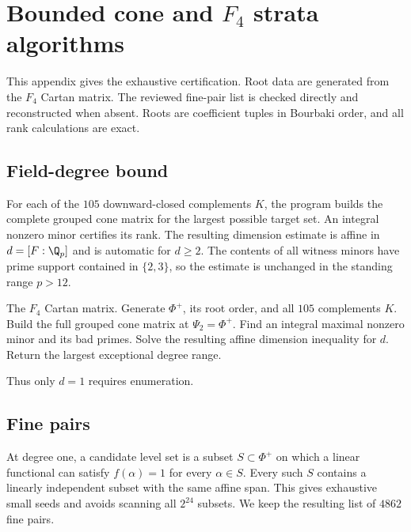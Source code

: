 \section{Bounded cone and $F_4$ strata algorithms}
\label{app:cone-model-algorithms}

This appendix gives the exhaustive certification.  Root data are generated
from the $F_4$ Cartan matrix.  The reviewed fine-pair list is checked directly
and reconstructed when absent.  Roots are coefficient tuples in Bourbaki
order, and all rank calculations are exact.

\subsection{Field-degree bound}

For each of the $105$ downward-closed complements $K$, the program builds the
complete grouped cone matrix for the largest possible target set.  An integral
nonzero minor certifies its rank.  The resulting dimension estimate is affine
in $d=[F:\Q_p]$ and is automatic for $d\ge2$.  The contents of all witness
minors have prime support contained in $\{2,3\}$, so the estimate is unchanged
in the standing range $p>12$.

\begin{tcolorbox}
\begin{algorithmic}[1]
\Require The $F_4$ Cartan matrix.
\State Generate $\Phi^+$, its root order, and all $105$ complements $K$.
  \State Build the full grouped cone matrix at $\Psi_2=\Phi^+$.
  \State Find an integral maximal nonzero minor and its bad primes.
  \State Solve the resulting affine dimension inequality for $d$.
\EndFor
\State Return the largest exceptional degree range.
\end{algorithmic}
\end{tcolorbox}
\renewcommand{\figurename}{Algorithm}
\label{alg:F4-degree-bound}

Thus only $d=1$ requires enumeration.

\subsection{Fine pairs}

At degree one, a candidate level set is a subset $S\subset\Phi^+$ on which a
linear functional can satisfy $f(\alpha)=1$ for every $\alpha\in S$.  Every
such $S$ contains a linearly independent subset with the same affine span.
This gives exhaustive small seeds and avoids scanning all $2^{24}$ subsets.
We keep the resulting list of $4862$ fine pairs.

